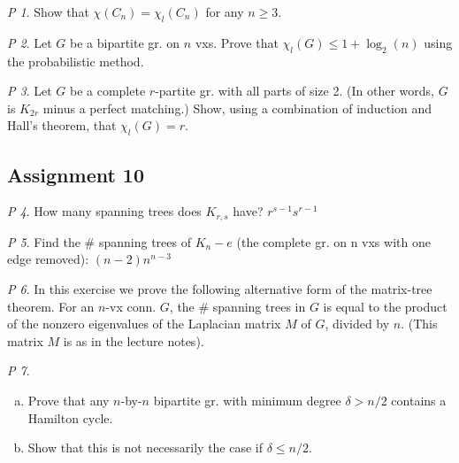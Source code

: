 \documentclass[11pt, fleqn, a4paper, landscape]{article}
\theoremstyle{plain} %
\theoremstyle{remark} %
\newtheorem{problem}{P}
\theoremstyle{definition} %
\begin{document}
\begin{multicols}{5}
\begin{problem}
Show that $\chi(C_n) = \chi_l(C_n)$ for any $n \ge 3$.
\end{problem}

\begin{problem}
Let $G$ be a bipartite gr. on $n$ vxs. Prove that $\chi_l(G)\le 1 + \log_2(n)$ using the probabilistic method.
\end{problem}

\begin{problem}
Let $G$ be a complete $r$-partite gr. with all parts of size 2. (In other words, $G$ is $K_{2r}$ minus a perfect matching.) Show, using a combination of induction and Hall's theorem, that $\chi_l(G) = r$.
\end{problem}

\subsection{Assignment 10}

\begin{problem}
How many spanning trees does $K_{r,s}$ have? $r^{s-1}s^{r-1}$
\end{problem}

\begin{problem}
Find the \# spanning trees of $K_n- e$ (the complete gr. on n vxs with one edge removed): $(n-2)n^{n-3}$
\end{problem}

\begin{problem}
In this exercise we prove the following alternative form of the matrix-tree theorem. For an $n$-vx conn. $G$, the \# spanning trees in $G$ is equal to the product of the  nonzero eigenvalues of the Laplacian matrix $M$ of $G$, divided by $n$. (This matrix $M$ is as in the lecture notes).
\end{problem}

\begin{problem}
\begin{enumerate}[(a)]
\item Prove that any $n$-by-$n$ bipartite gr. with minimum degree $\delta > n/2$ contains a Hamilton cycle.
\item  Show that this is not necessarily the case if $\delta\le n/2$.
\end{enumerate}
\end{problem}


\end{multicols}
\end{document}

